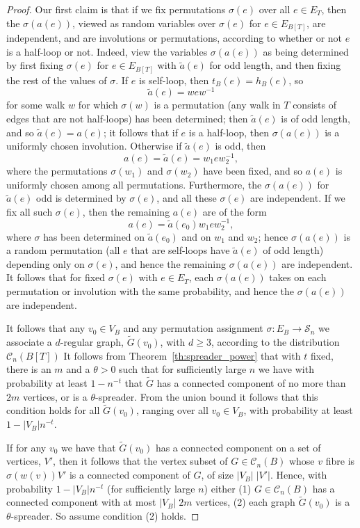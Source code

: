 \documentclass{memo-l}
\theoremstyle{plain}
\theoremstyle{definition}
\numberwithin{section}{chapter}
\numberwithin{equation}{chapter}
\newcommand{\from}{\colon}
\theoremstyle{plain}
\theoremstyle{definition}
\newcommand\cC{\mathcal{C}}
\newcommand\cS{\mathcal{S}}
\begin{document}
\begin{proof}
Our first claim is that if we fix permutations $\sigma(e)$ over all
$e\in E_T$, then the $\sigma(a(e))$, viewed as random variables over
$\sigma(e)$ for $e\in E_{B[T]}$, are independent, and are involutions or
permutations, according to whether or not $e$ is a half-loop or not.
Indeed, view the variables $\sigma(a(e))$ as being determined by first
fixing $\sigma(e)$ for $e\in E_{B[T]}$ with $\tilde a(e)$ for odd length,
and then fixing the rest of the values of $\sigma$.
If $e$ is self-loop, then $t_B(e)=h_B(e)$, so
$$
\tilde a(e) = w e w^{-1} 
$$
for some walk $w$ for which $\sigma(w)$ is a permutation (any walk in $T$
consists of edges that are not half-loops) has been determined;
then $\tilde a(e)$ is of odd length, and so $\tilde a(e)=a(e)$;
it follows that if $e$ is a half-loop, then $\sigma(a(e))$ is
a uniformly chosen involution.
Otherwise if $\tilde a(e)$ is odd, then
$$
a(e) = \tilde a(e) = w_1 e w_2^{-1},
$$
where the permutations $\sigma(w_1)$ and $\sigma(w_2)$ have been fixed,
and so $a(e)$ is uniformly chosen among all permutations.
Furthermore, the $\sigma(a(e))$ for $\tilde a(e)$ odd is
determined by $\sigma(e)$, and all these $\sigma(e)$ are independent.
If we fix all such $\sigma(e)$, then the remaining $a(e)$ are of the
form
$$
a(e) =  \tilde a(e_0) w_1 e w_2^{-1},
$$
where $\sigma$ has been determined on $\tilde a(e_0)$ and on
$w_1$ and $w_2$; hence $\sigma(a(e))$ is a random permutation
(all $e$ that are self-loops have $\tilde a(e)$ of odd length)
depending only on $\sigma(e)$,
and hence the remaining $\sigma(a(e))$ are independent.
It follows that for fixed $\sigma(e)$ with $e\in E_T$, each
$\sigma(a(e))$ takes on each permutation or involution with
the same probability, and hence the $\sigma(a(e))$ are independent.

It follows that any $v_0\in V_B$ and any permutation assignment
$\sigma\from E_B\to \cS_n$ we associate a $d$-regular graph,
$\widetilde G(v_0)$, with $d\ge 3$, according to the distribution
$\cC_n(B[T])$ 
It follows 
from Theorem~\ref{th:spreader_power} that with $t$ fixed, there is
an $m$ and a $\theta>0$ such that for sufficiently large $n$ 
we have with probability at least
$1-n^{-t}$ that $\widetilde G$ has a connected component of no more than
$2m$ vertices, or is a $\theta$-spreader.
From the union bound it follows that this condition holds for all 
$\widetilde G(v_0)$, ranging over all $v_0\in V_B$, with probability
at least $1-|V_B|n^{-t}$.

If for any $v_0$ we have that $\widetilde G(v_0)$ has a connected component
on a set of vertices, $V'$, then it follows that the vertex subset
of $G\in \cC_n(B)$ whose $v$ fibre is $\sigma(w(v))V'$
is a connected component of $G$, of size $|V_B|\;|V'|$.
Hence, with probability $1-|V_B|n^{-t}$ (for sufficiently large $n$)
either
(1) $G\in \cC_n(B)$ has a connected component with at most
$|V_B|\;2m$ vertices,
(2) each graph $\widetilde G(v_0)$ is a $\theta$-spreader.
So assume condition (2) holds.


\end{proof}
\end{document}
